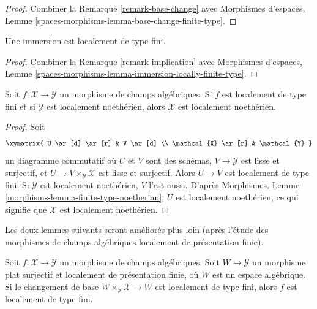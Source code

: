 \begin{proof}
Combiner la Remarque \ref{remark-base-change} avec Morphismes d'espaces,
Lemme \ref{spaces-morphisms-lemma-base-change-finite-type}.
\end{proof}

\begin{lemma}
\label{lemma-immersion-locally-finite-type}
Une immersion est localement de type fini.
\end{lemma}

\begin{proof}
Combiner la Remarque \ref{remark-implication} avec Morphismes d'espaces,
Lemme \ref{spaces-morphisms-lemma-immersion-locally-finite-type}.
\end{proof}

\begin{lemma}
\label{lemma-locally-finite-type-locally-noetherian}
Soit $f : \mathcal{X} \to \mathcal{Y}$ un morphisme de champs algébriques.
Si $f$ est localement de type fini et si $\mathcal{Y}$ est localement
noethérien, alors $\mathcal{X}$ est localement noethérien.
\end{lemma}

\begin{proof}
Soit
$$
\xymatrix{
U \ar[d] \ar[r] & V \ar[d] \\
\mathcal{X} \ar[r] & \mathcal{Y}
}
$$
un diagramme commutatif où $U$ et $V$ sont des schémas,
$V \to \mathcal{Y}$ est lisse et surjectif, et
$U \to V \times_\mathcal{Y} \mathcal{X}$ est lisse et surjectif.
Alors $U \to V$ est localement de type fini. Si $\mathcal{Y}$ est
localement noethérien, $V$ l'est aussi. D'après Morphismes, Lemme
\ref{morphisms-lemma-finite-type-noetherian}, $U$ est localement
noethérien, ce qui signifie que $\mathcal{X}$ est localement noethérien.
\end{proof}

\noindent
Les deux lemmes suivants seront améliorés plus loin (après l'étude des
morphismes de champs algébriques localement de présentation finie).

\begin{lemma}
\label{lemma-check-finite-type-covering}
Soit $f : \mathcal{X} \to \mathcal{Y}$ un morphisme de champs algébriques.
Soit $W \to \mathcal{Y}$ un morphisme plat surjectif et localement de
présentation finie, où $W$ est un espace algébrique. Si le changement
de base $W \times_\mathcal{Y} \mathcal{X} \to W$ est localement de
type fini, alors $f$ est localement de type fini.
\end{lemma}

